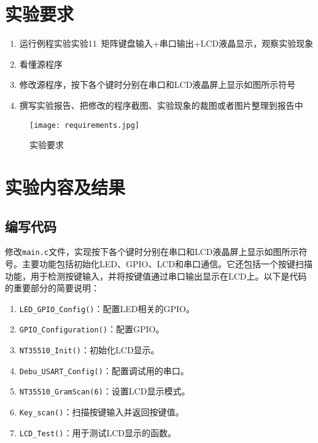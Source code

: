 \documentclass{math201}
\begin{document}

\makecover


\section{实验要求}

\begin{enumerate}
  \item 运行例程实验实验11 矩阵键盘输入+串口输出+LCD液晶显示，观察实验现象
  \item 看懂源程序
  \item 修改源程序，按下各个键时分别在串口和LCD液晶屏上显示如图所示符号
  \item 撰写实验报告、把修改的程序截图、实验现象的裁图或者图片整理到报告中
\end{enumerate}

\begin{figure}[H]
  \centering\texttt{[image: requirements.jpg]}
  \caption{实验要求}      
\end{figure}

\section{实验内容及结果}

\subsection{编写代码}

修改\texttt{main.c}文件，实现按下各个键时分别在串口和LCD液晶屏上显示如图所示符号。主要功能包括初始化LED、GPIO、LCD和串口通信。它还包括一个按键扫描功能，用于检测按键输入，并将按键值通过串口输出显示在LCD上。以下是代码的重要部分的简要说明：

\begin{enumerate}
  \item \texttt{LED\_GPIO\_Config()}：配置LED相关的GPIO。
  \item \texttt{GPIO\_Configuration()}：配置GPIO。
  \item \texttt{NT35510\_Init()}：初始化LCD显示。
  \item \texttt{Debu\_USART\_Config()}：配置调试用的串口。
  \item \texttt{NT35510\_GramScan(6)}：设置LCD显示模式。
  \item \texttt{Key\_scan()}：扫描按键输入并返回按键值。
  \item \texttt{LCD\_Test()}：用于测试LCD显示的函数。
\end{enumerate}
\end{document}
